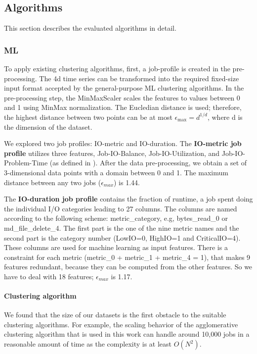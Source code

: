 \documentclass{jhps}
\makeatletter
\newcommand{\jk}[1]{\todo[inline]{JK:\@#1}}
\makeatother
\begin{document}
\subsection{Algorithms}
This section describes the evaluated algorithms in detail.

\subsubsection{ML}

To apply existing clustering algorithms, first, a job-profile is created in the pre-processing.
The 4d time series can be transformed into the required fixed-size input format accepted by the general-purpose ML clustering algorithms.
In the pre-processing step, the MinMaxScaler scales the features to values between 0 and 1 using MinMax normalization.
The Eucledian distance is used; therefore, the highest distance between two points can be at most \(\epsilon_\text{max} = d^{1/d}\), where d is the dimension of the dataset.

We explored two job profiles: IO-metric and IO-duration.
The \textbf{IO-metric job profile} utilizes three features, Job-IO-Balance, Job-IO-Utilization, and Job-IO-Problem-Time (as defined in \cite{iocats2020}).
After the data pre-processing, we obtain a set of 3-dimensional data points with a domain between 0 and 1.
The maximum distance between any two jobs ($\epsilon_{max}$) is 1.44.

The \textbf{IO-duration job profile} contains the fraction of runtime, a job spent doing the individual I/O categories leading to 27 columns.
The columns are named according to the following scheme: metric\_category, e.g, bytes\_read\_0 or md\_file\_delete\_4.
The first part is the one of the nine metric names and the second part is the category number (LowIO=0, HighIO=1 and CriticalIO=4).
These columns are used for machine learning as input features.
There is a constraint for each metric (metric\_0 + metric\_1 + metric\_4 = 1), that makes 9 features redundant, because they can be computed from the other features.
So we have to deal with 18 features; $\epsilon_{max}$ is 1.17.

\paragraph{Clustering algorithm}
We found that the size of our datasets is the first obstacle to the suitable clustering algorithms.
For example, the scaling behavior of the agglomerative clustering algorithm that is used in this work can handle around 10,000 jobs in a reasonable amount of time as the complexity is at least $O(N^{2})$.
\end{document}
